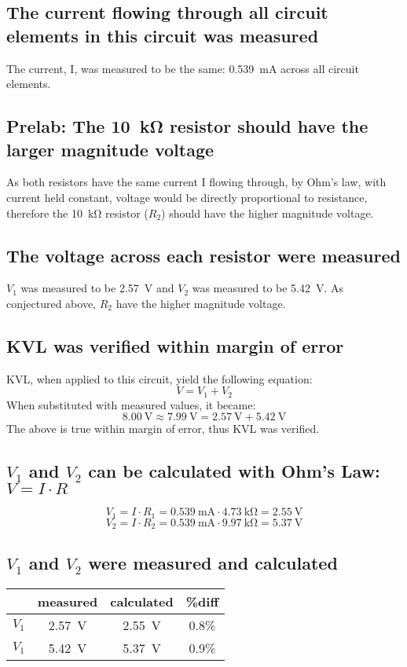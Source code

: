 \documentclass{article}
\begin{document}
\subsection{The current flowing through all circuit elements in this circuit was measured}
The current, I, was measured to be the same: \SI{0.539}{\milli\ampere} across all circuit elements.

\subsection{Prelab: The \SI{10}{\kilo\ohm} resistor should have the larger magnitude voltage}
As both resistors have the same current I flowing through, by Ohm's law, with current held constant, voltage would be directly proportional to resistance, therefore the \SI{10}{\kilo\ohm} resistor ($R_2$) should have the higher magnitude voltage.

\subsection{The voltage across each resistor were measured}
$V_1$ was measured to be \SI{2.57}{\volt} and $V_2$ was measured to be \SI{5.42}{\volt}. As conjectured above, $R_2$ have the higher magnitude voltage.

\subsection{KVL was verified within margin of error}
KVL, when applied to this circuit, yield the following equation:
\[V=V_1+V_2\]
When substituted with measured values, it became:
\[\SI{8.00}{\volt}\approx\SI{7.99}{\volt}=\SI{2.57}{\volt}+\SI{5.42}{\volt}\]
The above is true within margin of error, thus KVL was verified.

\subsection{$V_1$ and $V_2$ can be calculated with Ohm's Law: $V=I\cdot R$}
\[ V_1 = I\cdot R_1 = \SI{0.539}{\milli\ampere}\cdot\SI{4.73}{\kilo\ohm}=\SI{2.55}{\volt} \]
\[ V_2 = I\cdot R_2 = \SI{0.539}{\milli\ampere}\cdot\SI{9.97}{\kilo\ohm}=\SI{5.37}{\volt} \]

\subsection{$V_1$ and $V_2$ were measured and calculated}
\begin{center}
    \begin{tabular}{|c|c c c|}
         \hline
         & measured & calculated & \%diff  \\
         \hline
         $V_1$ & \SI{2.57}{\volt} & \SI{2.55}{\volt} & 0.8\% \\
         $V_1$ & \SI{5.42}{\volt} & \SI{5.37}{\volt} & 0.9\% \\
         \hline
    \end{tabular}
\end{center}
\end{document}
